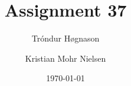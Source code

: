 \documentclass[pdftex,12pt,a4paper]{article}
\begin{document}
\title{Assignment 37}
\author{Tróndur Høgnason \and  Kristian Mohr Nielsen}
\date{\today}
\maketitle
\pagebreak


\pagebreak

\pagebreak

\pagebreak

\end{document}
